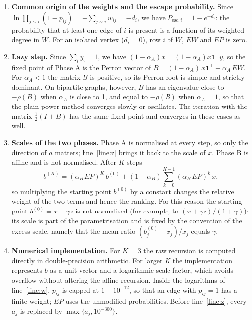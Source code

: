 \documentclass[11pt,a4paper]{article}
\newcommand{\one}{\mathbf{1}}
\newcommand{\KB}{3}
\begin{document}
\begin{enumerate}[leftmargin=1.5em,itemsep=3pt]
\item \textbf{Common origin of the weights and the escape probability.} Since $\ln\prod_{j\sim i}(1-p_{ij})=-\sum_{j\sim i}w_{ij}=-d_i$, we have $P_{\mathrm{esc},i}=1-e^{-d_i}$: the probability that at least one edge of $i$ is present is a function of its weighted degree in $W$. For an isolated vertex ($d_i=0$), row $i$ of $W$, $EW$ and $EP$ is zero.

\item \textbf{Lazy step.} Since $\sum_i y_i=1$, we have $(1-\alpha_A)x=(1-\alpha_A)x\one^{\top}y$, so the fixed point of Phase A is the Perron vector of $B=(1-\alpha_A)\,x\one^{\top}+\alpha_A\,EW$. For $\alpha_A<1$ the matrix $B$ is positive, so its Perron root is simple and strictly dominant. On bipartite graphs, however, $B$ has an eigenvalue close to $-\rho(B)$ when $\alpha_A$ is close to 1, and equal to $-\rho(B)$ when $\alpha_A=1$, so that the plain power method converges slowly or oscillates. The iteration with the matrix $\tfrac12(I+B)$ has the same fixed point and converges in these cases as well.

\item \textbf{Scales of the two phases.} Phase A is normalised at every step, so only the direction of $a$ matters; line~\ref{line:z} brings it back to the scale of $x$. Phase B is affine and is not normalised. After $K$ steps
\[
b^{(K)}=(\alpha_B\,EP)^{K}\,b^{(0)}+(1-\alpha_B)\sum_{k=0}^{K-1}(\alpha_B\,EP)^{k}\,x ,
\]
so multiplying the starting point $b^{(0)}$ by a constant changes the relative weight of the two terms and hence the ranking. For this reason the starting point $b^{(0)}=x+\gamma z$ is not normalised (for example, to $(x+\gamma z)/(1+\gamma)$): its scale is part of the parametrisation and is fixed by the convention of the excess scale, namely that the mean ratio $(b^{(0)}_j-x_j)/x_j$ equals $\gamma$.

\item \textbf{Numerical implementation.} For $K=\KB$ the raw recursion is computed directly in double-precision arithmetic. For larger $K$ the implementation represents $b$ as a unit vector and a logarithmic scale factor, which avoids overflow without altering the affine recursion. Inside the logarithms of line~\ref{line:w}, $p_{ij}$ is capped at $1-10^{-12}$, so that an edge with $p_{ij}=1$ has a finite weight; $EP$ uses the unmodified probabilities. Before line~\ref{line:z}, every $a_j$ is replaced by $\max\{a_j,10^{-300}\}$.


\end{enumerate}
\end{document}
